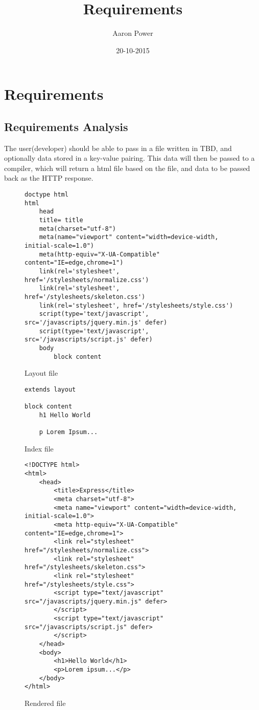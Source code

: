 \documentclass[draft]{report}
\title{Requirements}
\date{20-10-2015}
\author{Aaron Power}
\begin{document}
\maketitle
\newpage
\tableofcontents
\newpage
\listoffigures
\newpage


\chapter{Requirements}
\section{Requirements Analysis}
The user(developer) should be able to pass in a file written in TBD, and optionally data stored in
a key-value pairing. This data will then be passed to a compiler, which will return a html
file based on the file, and data to be passed back as the HTTP response.


\begin{figure}[ht!]
\caption{Layout file}
\begin{verbatim}
doctype html
html
    head
    title= title
    meta(charset="utf-8")
    meta(name="viewport" content="width=device-width, initial-scale=1.0")
    meta(http-equiv="X-UA-Compatible" content="IE=edge,chrome=1")
    link(rel='stylesheet', href='/stylesheets/normalize.css')
    link(rel='stylesheet', href='/stylesheets/skeleton.css')
    link(rel='stylesheet', href='/stylesheets/style.css')
    script(type='text/javascript', src='/javascripts/jquery.min.js' defer)
    script(type='text/javascript', src='/javascripts/script.js' defer)
    body
        block content
\end{verbatim}
\end{figure}

\begin{figure}[ht!]
\caption{Index file}
\begin{verbatim}
extends layout

block content
    h1 Hello World

    p Lorem Ipsum...
\end{verbatim}
\end{figure}

\begin{figure}[ht!]
    \caption{Rendered file}
    \begin{verbatim}
<!DOCTYPE html>
<html>
    <head>
        <title>Express</title>
        <meta charset="utf-8">
        <meta name="viewport" content="width=device-width, initial-scale=1.0">
        <meta http-equiv="X-UA-Compatible" content="IE=edge,chrome=1">
        <link rel="stylesheet" href="/stylesheets/normalize.css">
        <link rel="stylesheet" href="/stylesheets/skeleton.css">
        <link rel="stylesheet" href="/stylesheets/style.css">
        <script type="text/javascript" src="/javascripts/jquery.min.js" defer>
        </script>
        <script type="text/javascript" src="/javascripts/script.js" defer>
        </script>
    </head>
    <body>
        <h1>Hello World</h1>
        <p>Lorem ipsum...</p>
    </body>
</html>
    \end{verbatim}
\end{figure}
\clearpage
\end{document}
